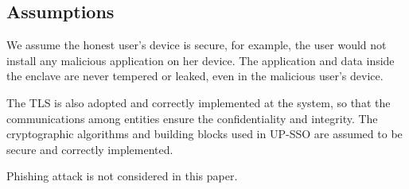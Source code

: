 \subsection{Assumptions}
We assume the honest user's device is secure, for example, the user would not install any malicious application on her device. The application and data inside the enclave are never tempered or leaked, even in the malicious user's device.

The TLS is also adopted and correctly implemented at the system, so that the communications among entities ensure the confidentiality and integrity.
The cryptographic algorithms and building blocks used in UP-SSO are assumed to be secure and correctly implemented. 

Phishing attack is not considered in this paper.

